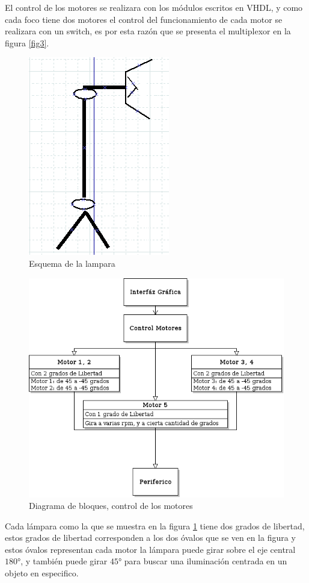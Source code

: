 \documentclass[twocolumn]{IEEEtran}
\begin{document}
El control de los motores se realizara con los módulos escritos en VHDL, y como cada foco tiene dos motores el control del funcionamiento de cada motor se realizara con un switch, es por esta razón que se presenta el multiplexor en la figura \ref{fig3}.
\begin{figure}[H]
	\centering
		\includegraphics[scale=0.5]{figura3.png}
	\caption{Esquema de la lampara}
	\label{fig4}
\end{figure}
\begin{figure}[H]
	\centering
		\includegraphics[scale=0.45]{dia2.png}
	\caption{Diagrama de bloques, control de los motores}
	\label{fig5}
\end{figure}
\noindent
Cada lámpara como la que se muestra en la figura \ref{fig4} tiene dos grados de libertad, estos grados de libertad corresponden a los dos óvalos que se ven en la figura y estos óvalos representan cada motor la lámpara puede girar sobre el eje central $180°$, y también puede girar $45°$ para buscar una iluminación centrada en un objeto en especifico.\\
\end{document}
